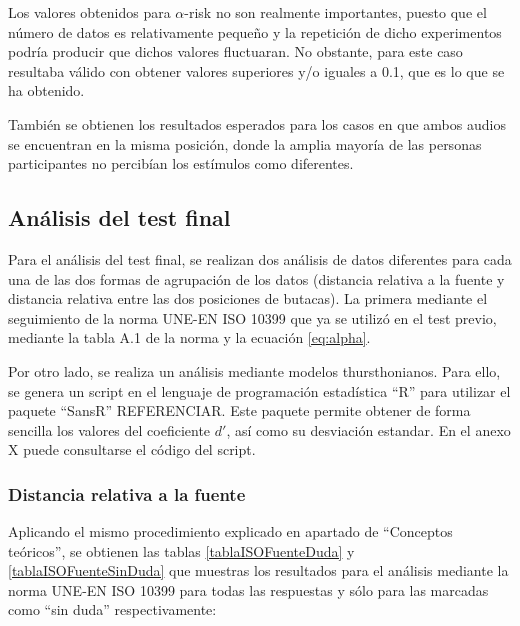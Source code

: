 \documentclass[11pt,a4paper,twoside]{book}
\begin{document}
		Los valores obtenidos para $\alpha$-risk no son realmente importantes, puesto que el número de datos es relativamente pequeño y la repetición de dicho experimentos podría producir que dichos valores fluctuaran. No obstante, para este caso resultaba válido con obtener valores superiores y/o iguales a 0.1, que es lo que se ha obtenido.
		
		También se obtienen los resultados esperados para los casos en que ambos audios se encuentran en la misma posición, donde la amplia mayoría de las personas participantes no percibían los estímulos como diferentes.
		
    \subsection{Análisis del test final}
        Para el análisis del test final, se realizan dos análisis de datos diferentes para cada una de las dos formas de agrupación de los datos (distancia relativa a la fuente y distancia relativa entre las dos posiciones de butacas). La primera mediante el seguimiento de la norma UNE-EN ISO 10399 que ya se utilizó en el test previo, mediante la tabla A.1 de la norma y la ecuación \ref{eq:alpha}.
        
        Por otro lado, se realiza un análisis mediante modelos thursthonianos. Para ello, se genera un script en el lenguaje de programación estadística ``R'' para utilizar el paquete ``SansR'' REFERENCIAR. Este paquete permite obtener de forma sencilla los valores del coeficiente $d'$, así como su desviación estandar. En el anexo X puede consultarse el código del script.
        
        
		\subsubsection*{Distancia relativa a la fuente}
		    Aplicando el mismo procedimiento explicado en apartado de ``Conceptos teóricos'', se obtienen las tablas \ref{tablaISOFuenteDuda} y \ref{tablaISOFuenteSinDuda} que muestras los resultados para el análisis mediante la norma UNE-EN ISO 10399 para todas las respuestas y sólo para las marcadas como ``sin duda'' respectivamente:
		    
\end{document}
